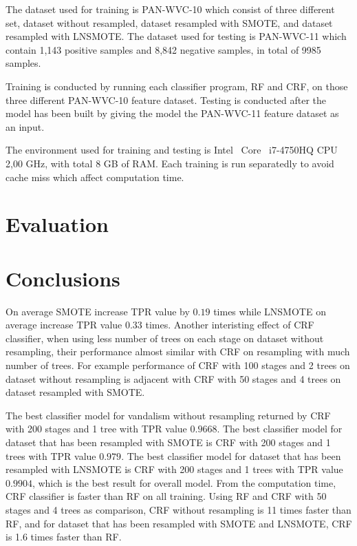 

The dataset used for training is PAN-WVC-10 which consist of three different
set, dataset without resampled, dataset resampled with SMOTE, and dataset
resampled with LNSMOTE.
The dataset used for testing is PAN-WVC-11 which contain 1,143 positive
samples and 8,842 negative samples, in total of 9985 samples.

Training is conducted by running each classifier program, RF and CRF, on
those three different PAN-WVC-10 feature dataset.
Testing is conducted after the model has been built by giving the model the
PAN-WVC-11 feature dataset as an input.

The environment used for training and testing is Intel\textregistered~
Core\texttrademark~ i7-4750HQ CPU 2,00 GHz, with total 8 GB of RAM.
Each training is run separatedly to avoid cache miss which affect computation
time.


\section{Evaluation}
	\label{section:result_and_analysis}
	

\section{Conclusions}
\label{section:conclusion}

On average SMOTE increase TPR value by $0.19$ times while LNSMOTE on average
increase TPR value $0.33$ times.
Another interisting effect of CRF classifier, when using less number of trees on
each stage on dataset without resampling, their performance almost similar with
CRF on resampling with much number of trees.
For example performance of CRF with 100 stages and 2 trees on dataset without
resampling is adjacent with CRF with 50 stages and 4 trees on dataset resampled
with SMOTE.

The best classifier model for vandalism without resampling returned by CRF with
200 stages and 1 tree with TPR value $0.9668$.
The best classifier model for dataset that has been resampled with SMOTE is CRF
with 200 stages and 1 trees with TPR value $0.979$.
The best classifier model for dataset that has been resampled with LNSMOTE is
CRF with 200 stages and 1 trees with TPR value $0.9904$, which is the best
result for overall model.
From the computation time, CRF classifier is faster than RF on all training.
Using RF and CRF with 50 stages and 4 trees as comparison, CRF without
resampling is 11 times faster than RF, and for dataset that has been resampled
with SMOTE and LNSMOTE, CRF is 1.6 times faster than RF.

